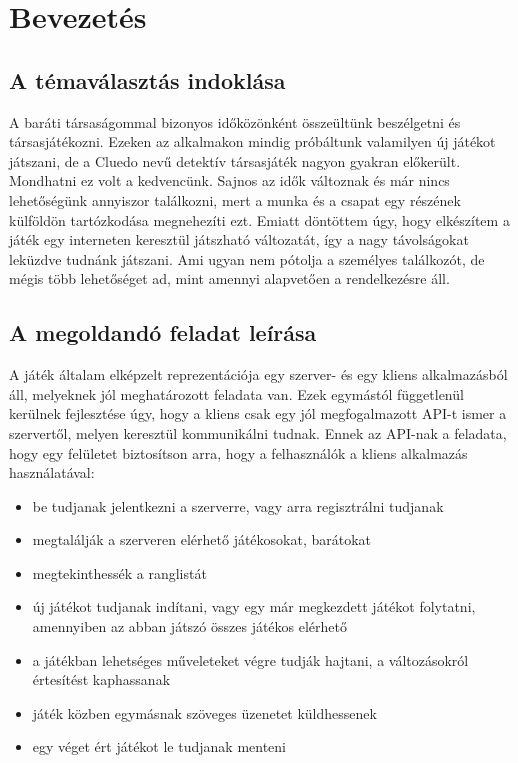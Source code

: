 \section{Bevezetés}

\subsection{A témaválasztás indoklása}
A baráti társaságommal bizonyos időközönként összeültünk beszélgetni és társasjátékozni.
Ezeken az alkalmakon mindig próbáltunk valamilyen új játékot játszani, de a Cluedo nevű
detektív társasjáték nagyon gyakran előkerült. Mondhatni ez volt a kedvencünk. Sajnos
az idők változnak és már nincs lehetőségünk annyiszor találkozni, mert a munka és a
csapat egy részének külföldön tartózkodása megnehezíti ezt. Emiatt döntöttem úgy, hogy
elkészítem a játék egy interneten keresztül játszható változatát, így a nagy távolságokat
leküzdve tudnánk játszani. Ami ugyan nem pótolja a személyes találkozót, de mégis
több lehetőséget ad, mint amennyi alapvetően a rendelkezésre áll.

\subsection{A megoldandó feladat leírása}
A játék általam elképzelt reprezentációja egy szerver- és egy kliens alkalmazásból
áll, melyeknek jól meghatározott feladata van. Ezek egymástól függetlenül kerülnek
fejlesztése úgy, hogy a kliens csak egy jól megfogalmazott API-t ismer a szervertől,
melyen keresztül kommunikálni tudnak. Ennek az API-nak a feladata, hogy egy felületet
biztosítson arra, hogy a felhasználók a kliens alkalmazás használatával:

\begin{itemize}
  \item be tudjanak jelentkezni a szerverre, vagy arra regisztrálni tudjanak
  \item megtalálják a szerveren elérhető játékosokat, barátokat
  \item megtekinthessék a ranglistát
  \item új játékot tudjanak indítani, vagy egy már megkezdett játékot folytatni, amennyiben az abban játszó összes játékos elérhető
  \item a játékban lehetséges műveleteket végre tudják hajtani, a változásokról értesítést kaphassanak
  \item játék közben egymásnak szöveges üzenetet küldhessenek
  \item egy véget ért játékot le tudjanak menteni
\end{itemize}

